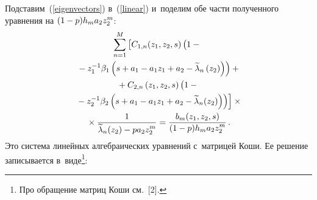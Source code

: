 \begin{multicols}{2}
Подставим~(\ref{eigenvectors}) в~(\ref{linear}) и~поделим обе части полученного 
уравнения на $(1\hm-p)h_m a_2 z_2^m$:
\begin{multline*}
\sum\limits_{n=1}^{M}\left[C_{1,n}(z_1,z_2,s)\left(1-
\vphantom{\tilde{\lambda}_n^{-1}}
{}\right.\right.\\
\left.{}-z_1^{-1}\beta_1
\left(s+a_1-a_1 z_1+a_2-\widetilde{\lambda}_n\left(z_2\right)\right)\right)+{}\\
{}+C_{2,n}\left(z_1,z_2,s\right)\left(
\vphantom{\tilde{\lambda}_n^{-1}}
1-{}\right.\\
\left.\left.{}-z_2^{-1}\beta_2
\left(s+a_1-a_1 z_1+a_2-\widetilde{\lambda}_n(z_2)\right)\right)
\right]\times{}\\
{}\times \fr{1}{\widetilde{\lambda}_n(z_2)-pa_2 z_2^m}=
\fr{b_m(z_1,z_2,s)}{(1-p)h_m a_2 z_2^m}\,.
\end{multline*}
Это система линейных алгебраических уравнений с~матрицей Коши. 
Ее решение записывается в~виде\footnote{Про обращение матриц Коши см.~[2].}:


\end{multicols}
